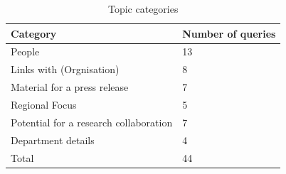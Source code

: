 \begin{table}[h]
\centering
\caption{Topic categories}
\label{table:topic_categories}
\begin{tabular}{@{}ll@{}}
\toprule
Category                               & Number of queries \\ \midrule
People                                 & 13                \\
Links with (Orgnisation)               & 8                 \\
Material for a press release           & 7                 \\
Regional Focus                         & 5                 \\
Potential for a research collaboration & 7                 \\
Department details                     & 4                 \\ \bottomrule
Total								  &	44				  
\end{tabular}
\end{table}

